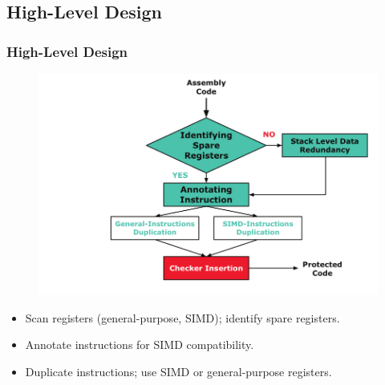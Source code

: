 \documentclass[
	12pt, %
]{beamer}
\begin{document}
\subsection{High-Level Design}
\begin{frame}
	\frametitle{High-Level Design}
	
	\begin{figure}
		\centering
		\includegraphics[width=0.7\linewidth]{Images/img10}
		\label{fig:img10}
	\end{figure}
	
		\begin{itemize}
			\item Scan registers (general-purpose, SIMD); identify spare registers.
			\item Annotate instructions for SIMD compatibility.
			\item Duplicate instructions; use SIMD or general-purpose registers.
		\end{itemize}
\end{frame}
\end{document}
